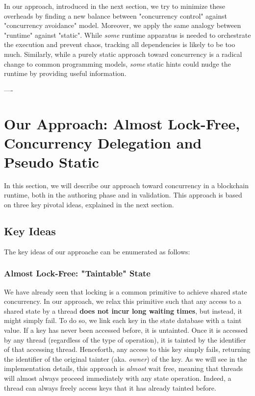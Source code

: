 In our approach, introduced in the next section, we try to minimize these overheads by finding a new
balance between "concurrency control" against "concurrency avoidance" model. Moreover, we apply the
same analogy between "runtime" against "static". While \textit{some} runtime apparatus is needed to
orchestrate the execution and prevent chaos, tracking all dependencies is likely to be too much.
Similarly, while a purely static approach toward concurrency is a radical change to common
programming models, \textit{some} static hints could nudge the runtime by providing useful
information.

----

\section{Our Approach: Almost Lock-Free, Concurrency Delegation and Pseudo Static}
\label{chap_desgin:sec:design}



In this section, we will describe our approach toward concurrency in a blockchain runtime, both in
the authoring phase and in validation. This approach is based on three key pivotal ideas, explained
in the next section.

\subsection{Key Ideas}

The key ideas of our approache can be enumerated as follows:

\subsubsection{Almost Lock-Free: "Taintable" State}\label{chapt_approach:subsubsec:taintable_state}

We have already seen that locking is a common primitive to achieve shared state concurrency. In our
approach, we relax this primitive such that any access to a shared state by a thread \textbf{does
not incur long waiting times}, but instead, it might simply fail. To do so, we link each key in the
state database with a taint value. If a key has never been accessed before, it is untainted. Once it
is accessed by any thread (regardless of the type of operation), it is tainted by the identifier
of that accessing thread. Henceforth, any access to this key simply fails, returning the identifier of the
original tainter (aka. \textit{owner}) of the key. As we will see in the implementation details,
this approach is \textit{almost} wait free, meaning that threads will almost always proceed
immediately with any state operation. Indeed, a thread can always freely access keys that it has
already tainted before.

